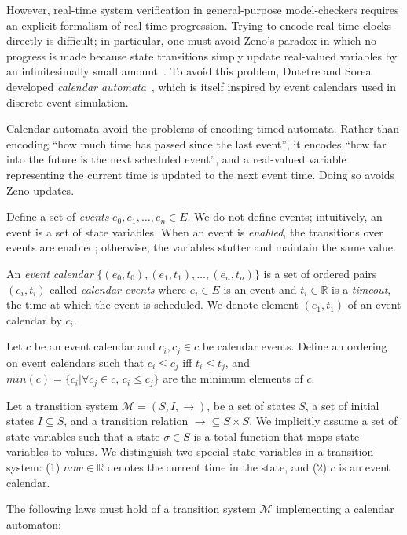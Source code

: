 \documentclass{IEEEtran/IEEEtran}
\begin{document}
However, real-time system verification in general-purpose model-checkers requires an explicit formalism of real-time progression. Trying to encode real-time clocks directly is difficult; in particular, one must avoid Zeno's paradox in which no progress is made because state transitions simply update real-valued variables by an infinitesimally small amount~\cite{bruno,lamport}. To avoid this problem, Dutetre and Sorea developed \emph{calendar automata}~\cite{bruno}, which is itself inspired by event calendars used in discrete-event simulation.

Calendar automata avoid the problems of encoding timed automata. Rather than encoding ``how much time has passed since the last event'', it encodes ``how far into the future is the next scheduled event'', and a real-valued variable representing the current time is updated to the next event time. Doing so avoids Zeno updates.

Define a set of \emph{events} $e_0, e_1, \ldots, e_n \in E$. We do not define events; intuitively, an event is a set of state variables. When an event is \emph{enabled}, the transitions over events are enabled; otherwise, the variables stutter and maintain the same value.

An \emph{event calendar} $\{ (e_0, t_0), (e_1, t_1), \ldots, (e_n, t_n) \}$ is a set of ordered pairs $(e_i, t_i)$ called \emph{calendar events} where $e_i \in E$ is an event and $t_i \in \mathbb{R}$ is a \emph{timeout}, the time at which the event is scheduled. We denote element $(e_1, t_1)$ of an event calendar by $c_i$.

Let $c$ be an event calendar and $c_i, c_j \in c$ be calendar events. Define an ordering on event calendars such that $c_i \leq c_j$ iff $t_i \leq t_j$, and $min(c) = \{ c_i | \forall c_j \in c, \, c_i \leq c_j  \}$ are the minimum elements of $c$.

Let a transition system $\mathcal{M} = (S, I, \rightarrow)$, be a set of states $S$, a set of initial states $I \subseteq S$, and a transition relation $\rightarrow \subseteq S \times S$. We implicitly assume a set of state variables such that a state $\sigma \in S$ is a total function that maps state variables to values. We distinguish two special state variables in a transition system: (1) $now \in \mathbb{R}$ denotes the current time in the state, and (2) $c$ is an event calendar.

The following laws must hold of a transition system $\mathcal{M}$ implementing a calendar automaton:
\end{document}
